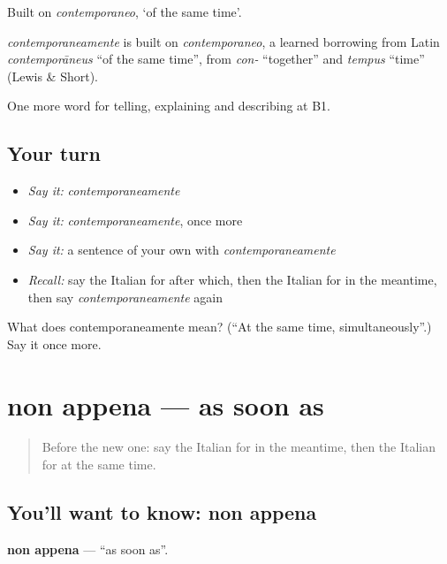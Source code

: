 Built on \emph{contemporaneo}, ‘of the same time’.

\begin{cousinweb}
\emph{contemporaneamente} is built on \emph{contemporaneo}, a learned borrowing from Latin \emph{contemporāneus} \textquotedblleft{}of the same time\textquotedblright{}, from \emph{con-} \textquotedblleft{}together\textquotedblright{} and \emph{tempus} \textquotedblleft{}time\textquotedblright{} (Lewis \& Short).
\end{cousinweb}

\begin{grammarlens}[title={What you've built}]
One more word for telling, explaining and describing at B1.
\end{grammarlens}

\subsection*{Your turn}
\begin{itemize}
\raggedright
  \item \emph{Say it:} \emph{contemporaneamente}
  \item \emph{Say it:} \emph{contemporaneamente}, once more
  \item \emph{Say it:} a sentence of your own with \emph{contemporaneamente}
  \item \emph{Recall:} say the Italian for after which, then the Italian for in the meantime, then say \emph{contemporaneamente} again
\end{itemize}

\begin{tcolorbox}[breakable,colback=teal!4,colframe=teal!35!black,title={Before you move on}]
What does contemporaneamente mean? (\textquotedblleft{}At the same time, simultaneously\textquotedblright{}.) Say it once more.
\end{tcolorbox}
\section[non appena]{non appena — as soon as}

\label{lesson:IT-C274-non-appena}



\begin{quote}
Before the new one: say the Italian for in the meantime, then the Italian for at the same time.
\end{quote}

\subsection*{You'll want to know: non appena}
\textbf{non appena} — \textquotedblleft{}as soon as\textquotedblright{}.

